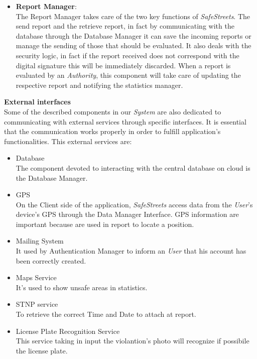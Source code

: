 \documentclass{article}
\begin{document}
\begin{itemize}
\item \textbf{Report Manager}: \\
The Report Manager takes care of the two key functions of \textit{SafeStreets}. The send report and 
the retrieve report, in fact by communicating with the database through the Database Manager 
it can save the incoming reports or manage the sending of those that should be evaluated. 
It also deals with the security logic, in fact if the report received does not correspond 
with the digital signature this will be immediately discarded. When a report is evaluated 
by an \textit{Authority}, this component will take care of updating the respective report and 
notifying the statistics manager.
\end{itemize}

\clearpage
\textbf{External interfaces} \\
Some of the described components in our \textit{System} are also dedicated to communicating 
with external services through specific interfaces. It is essential that the communication 
works properly in order to fulfill application's functionalities.
This external services are:
\begin{itemize}
    \item Database \\
    The component devoted to interacting with the central database on 
    cloud is the Database Manager.
    \item GPS \\
    On the Client side of the application, \textit{SafeStreets} access data from 
    the \textit{User}'s device's GPS through
    the Data Manager Interface. GPS information are important because are used in 
    report to locate a position. 
    \item Mailing System \\
    It used by Authentication Manager to inform an \textit{User} that his account 
    has been correctly created. 
    \item Maps Service \\ 
    It's used to show unsafe areas in statistics.  
    \item STNP service \\
    To retrieve the correct Time and Date to attach at report.
    \item License Plate Recognition Service \\
    This service taking in input the violantion's photo will recognize if possibile 
    the license plate.
\end{itemize} 
\end{document}
